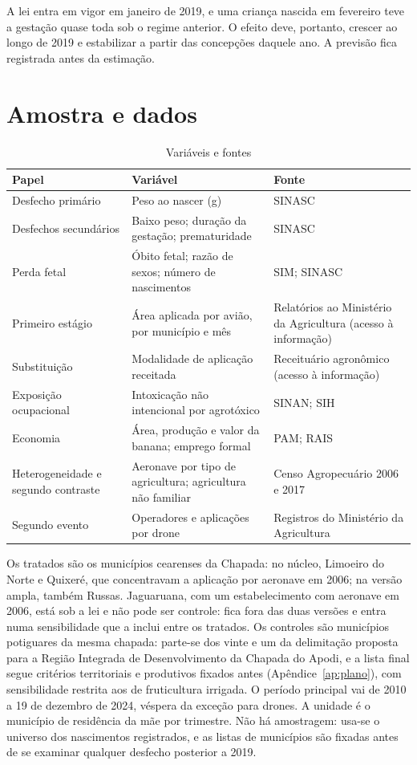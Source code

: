 A lei entra em vigor em janeiro de 2019, e uma criança nascida em fevereiro teve
a gestação quase toda sob o regime anterior. O efeito deve, portanto, crescer ao
longo de 2019 e estabilizar a partir das concepções daquele ano. A previsão fica
registrada antes da estimação.

\section{Amostra e dados}

\begin{table}[!htb]
\centering\small
\caption{Variáveis e fontes}
\label{tab:dados}
\begin{tabularx}{\textwidth}{@{}p{3.6cm}LL@{}}
\toprule
Papel & Variável & Fonte \\
\midrule
Desfecho primário & Peso ao nascer (g) & SINASC \\
Desfechos secundários & Baixo peso; duração da gestação; prematuridade & SINASC \\
Perda fetal & Óbito fetal; razão de sexos; número de nascimentos & SIM; SINASC \\
Primeiro estágio & Área aplicada por avião, por município e mês & Relatórios ao Ministério da Agricultura (acesso à informação) \\
Substituição & Modalidade de aplicação receitada & Receituário agronômico (acesso à informação) \\
Exposição ocupacional & Intoxicação não intencional por agrotóxico & SINAN; SIH \\
Economia & Área, produção e valor da banana; emprego formal & PAM; RAIS \\
Heterogeneidade e segundo contraste & Aeronave por tipo de agricultura; agricultura não familiar & Censo Agropecuário 2006 e 2017 \\
Segundo evento & Operadores e aplicações por drone & Registros do Ministério da Agricultura \\
\bottomrule
\end{tabularx}
\end{table}

Os tratados são os municípios cearenses da Chapada: no núcleo, Limoeiro do Norte
e Quixeré, que concentravam a aplicação por aeronave em 2006; na versão ampla,
também Russas. Jaguaruana, com um estabelecimento com aeronave em 2006, está
sob a lei e não pode ser controle: fica fora das duas versões e entra numa
sensibilidade que a inclui entre os tratados. Os controles são municípios potiguares da mesma chapada: parte-se
dos vinte e um da delimitação proposta para a Região Integrada de
Desenvolvimento da Chapada do Apodi, e a lista final segue critérios
territoriais e produtivos fixados antes (Apêndice~\ref{ap:plano}), com
sensibilidade restrita aos de fruticultura irrigada. O período principal vai de 2010 a 19 de dezembro de 2024, véspera da exceção para drones. A unidade é o
município de residência da mãe por trimestre. Não há amostragem: usa-se o
universo dos nascimentos registrados, e as listas de municípios são fixadas
antes de se examinar qualquer desfecho posterior a 2019.


